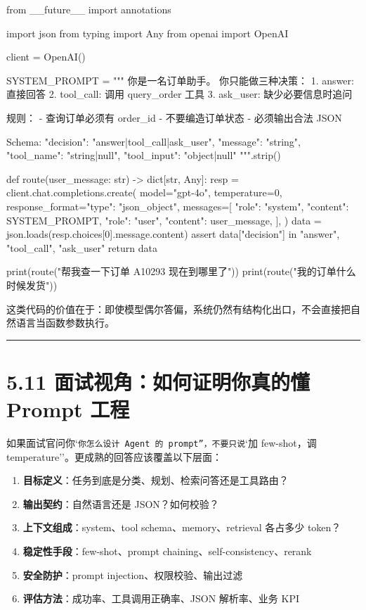 \begin{codeblock}
from __future__ import annotations

import json
from typing import Any
from openai import OpenAI

client = OpenAI()

SYSTEM_PROMPT = """
你是一名订单助手。
你只能做三种决策：
1. answer: 直接回答
2. tool_call: 调用 query_order 工具
3. ask_user: 缺少必要信息时追问

规则：
- 查询订单必须有 order_id
- 不要编造订单状态
- 必须输出合法 JSON

Schema:
{
  "decision": "answer|tool_call|ask_user",
  "message": "string",
  "tool_name": "string|null",
  "tool_input": "object|null"
}
""".strip()


def route(user_message: str) -> dict[str, Any]:
    resp = client.chat.completions.create(
        model="gpt-4o",
        temperature=0,
        response_format={"type": "json_object"},
        messages=[
            {"role": "system", "content": SYSTEM_PROMPT},
            {"role": "user", "content": user_message},
        ],
    )
    data = json.loads(resp.choices[0].message.content)
    assert data["decision"] in {"answer", "tool_call", "ask_user"}
    return data


print(route("帮我查一下订单 A10293 现在到哪里了"))
print(route("我的订单什么时候发货"))
\end{codeblock}

这类代码的价值在于：即使模型偶尔答偏，系统仍然有结构化出口，不会直接把自然语言当函数参数执行。


\bigskip\hrule\bigskip

\section{5.11 面试视角：如何证明你真的懂 Prompt 工程}

如果面试官问你`\texttt{你怎么设计 Agent 的 prompt''，不要只说}`加 few-shot，调 temperature''。更成熟的回答应该覆盖以下层面：


\begin{enumerate}[leftmargin=2em]
\item \textbf{目标定义}：任务到底是分类、规划、检索问答还是工具路由？
\item \textbf{输出契约}：自然语言还是 JSON？如何校验？
\item \textbf{上下文组成}：system、tool schema、memory、retrieval 各占多少 token？
\item \textbf{稳定性手段}：few-shot、prompt chaining、self-consistency、rerank
\item \textbf{安全防护}：prompt injection、权限校验、输出过滤
\item \textbf{评估方法}：成功率、工具调用正确率、JSON 解析率、业务 KPI
\end{enumerate}

